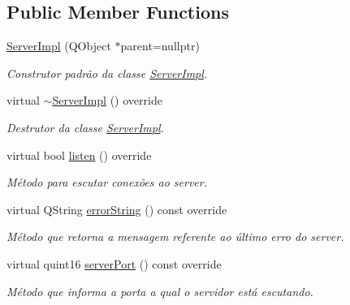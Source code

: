 \subsection*{Public Member Functions}
\begin{DoxyCompactItemize}
\item 
\hyperlink{classServerImpl_a0c81e2a5af6cea9a1ff0445008c22e84}{Server\+Impl} (Q\+Object $\ast$parent=nullptr)
\begin{DoxyCompactList}\small\item\em Construtor padrão da classe \hyperlink{classServerImpl}{Server\+Impl}. \end{DoxyCompactList}\item 
virtual \hyperlink{classServerImpl_aef0bf73c21130de67a3f262dff915cd2}{$\sim$\+Server\+Impl} () override
\begin{DoxyCompactList}\small\item\em Destrutor da classe \hyperlink{classServerImpl}{Server\+Impl}. \end{DoxyCompactList}\item 
virtual bool \hyperlink{classServerImpl_a3a186b4e86c634750f8fb95f962d5ec9}{listen} () override
\begin{DoxyCompactList}\small\item\em Método para escutar conexões ao server. \end{DoxyCompactList}\item 
virtual Q\+String \hyperlink{classServerImpl_aaadf6ebb053052ee61303848374e8d20}{error\+String} () const override
\begin{DoxyCompactList}\small\item\em Método que retorna a mensagem referente ao último erro do server. \end{DoxyCompactList}\item 
virtual quint16 \hyperlink{classServerImpl_a769680151e32d74aeae35dfbb1dcbde0}{server\+Port} () const override
\begin{DoxyCompactList}\small\item\em Método que informa a porta a qual o servidor está escutando. \end{DoxyCompactList}\end{DoxyCompactItemize}
